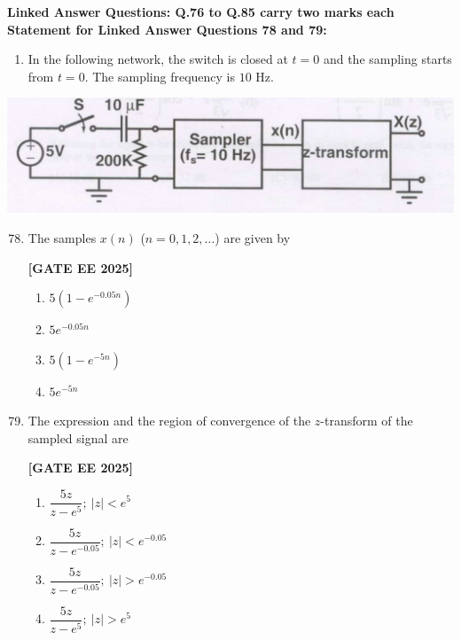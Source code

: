 \documentclass[12pt]{article}
\begin{document}
\vspace{1em}
 \large \textbf {Linked Answer Questions: Q.76 to Q.85 carry two marks each}
 \large \textbf {Statement for Linked Answer Questions 78 and 79: }
\vspace{1em}
 \begin{enumerate}
\item In the following network, the switch is closed at $t=0$ and the sampling starts from $t=0$. The sampling frequency is $10$ Hz.
\end{enumerate}
\begin{center}
\includegraphics[width=0.6\columnwidth]{figs/q7879.png}
\end{center}

\begin{enumerate}[leftmargin=*, label=\textbf{Q.\arabic*:}]
\setcounter{enumi}{77}

\item The samples $x(n)$ ($n=0,1,2,\ldots$) are given by
 
\noindent \textbf{[GATE EE 2025]}
\begin{enumerate}
  \item $5 \left( 1 - e^{-0.05 n} \right)$
  \item $5 e^{-0.05 n}$
  \item $5 \left( 1 - e^{-5 n} \right)$
  \item $5 e^{-5 n}$
\end{enumerate}

\item The expression and the region of convergence of the $z$-transform of the sampled signal are
 
\noindent \textbf{[GATE EE 2025]}
\begin{enumerate}
  \item $\dfrac{5z}{z-e^{5}};~ |z|<e^{5}$
  \item $\dfrac{5z}{z-e^{-0.05}};~ |z|<e^{-0.05}$
  \item $\dfrac{5z}{z-e^{-0.05}};~ |z|>e^{-0.05}$
  \item $\dfrac{5z}{z-e^{5}};~ |z|>e^{5}$
\end{enumerate}

\end{enumerate}
\end{document}

